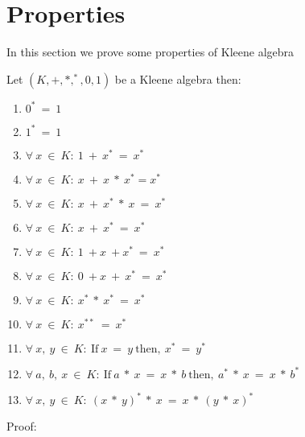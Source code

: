 \section{Properties}
In this section we prove some properties of Kleene algebra

Let $(K, +, *, ^{*}, 0, 1)$ be a Kleene algebra then:
\begin{enumerate}
\item $0^{*}\ =\ 1$
\item $1^{*}\ =\ 1$
\item $\forall \ x\ \in\ K:\ 1\ +\ x^{*}\ =\ x^{*}$
\item $\forall \ x\ \in\ K:\ x\ +\ x\ *\ x^{*} = x^{*}$
\item $\forall \ x\ \in\ K:\ x\ +\ x^{*}\ *\ x\ =\ x^{*}$
\item $\forall \ x\ \in\ K:\ x\ +\ x^{*}\ =\ x^{*}$
\item $\forall \ x\ \in\ K:\ 1\ + x\ + x^{*}\ =\ x^{*}$
\item $\forall \ x\ \in\ K:\ 0\ + x\ +\ x^{*}\ =\ x^{*}$
\item $\forall \ x\ \in\ K:\ x^{*}\ *\ x^{*}\ =\ x^{*}$
\item $\forall \ x\ \in\ K:\ x^{**}\ =\ x^{*}$
\item $\forall\ x,\ y\ \in\ K:\ \text{If}\ x\ =\ y\ \text{then},\ x^{*}\ =\ y^{*}$
\item $\forall\ a,\ b,\ x\ \in\ K:\ \text{If}\ a\ *\ x\ =\ x\ *\ b\ \text{then},\ a^{*}\ *\ x\ =\ x\ *\ b^{*}$
\item $\forall\ x,\ y\ \in\ K:\ (x\ *\ y)^{*}\ *\ x\ =\ x\ *\ (y\ *\ x)^{*}$
\end{enumerate}
Proof:
